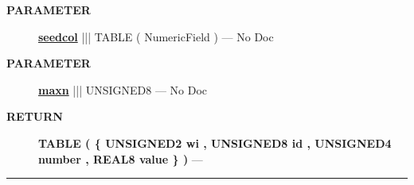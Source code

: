 \par
\begin{description}
\item [\colorbox{tagtype}{\color{white} \textbf{\textsf{PARAMETER}}}] \textbf{\underline{seedcol}} ||| TABLE ( NumericField ) --- No Doc
\item [\colorbox{tagtype}{\color{white} \textbf{\textsf{PARAMETER}}}] \textbf{\underline{maxn}} ||| UNSIGNED8 --- No Doc
\end{description}







\par
\begin{description}
\item [\colorbox{tagtype}{\color{white} \textbf{\textsf{RETURN}}}] \textbf{TABLE ( \{ UNSIGNED2 wi , UNSIGNED8 id , UNSIGNED4 number , REAL8 value \} )} --- 
\end{description}




\rule{\linewidth}{0.5pt}



